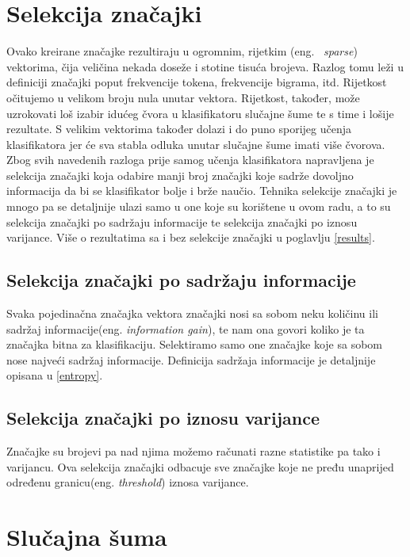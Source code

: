 \section{Selekcija značajki}
Ovako kreirane značajke rezultiraju u ogromnim, rijetkim (eng.~ \textit{sparse}) vektorima, čija veličina nekada doseže i stotine tisuća brojeva. Razlog tomu leži u definiciji značajki poput frekvencije tokena, frekvencije bigrama, itd. Rijetkost očitujemo u velikom broju nula unutar vektora. Rijetkost, također, može uzrokovati loš izabir idućeg čvora u klasifikatoru slučajne šume te s time i lošije rezultate. S velikim vektorima također dolazi i do puno sporijeg učenja klasifikatora jer će sva stabla odluka unutar slučajne šume imati više čvorova. Zbog svih navedenih razloga prije samog učenja klasifikatora napravljena je selekcija značajki koja odabire manji broj značajki koje sadrže dovoljno informacija da bi se klasifikator bolje i brže naučio. Tehnika selekcije značajki je mnogo pa se detaljnije ulazi samo u one koje su korištene u ovom radu, a to su selekcija značajki po sadržaju informacije te selekcija značajki po iznosu varijance. Više o rezultatima sa i bez selekcije značajki u poglavlju \ref{results}.

\subsection{Selekcija značajki po sadržaju informacije}

Svaka pojedinačna značajka vektora značajki nosi sa sobom neku količinu ili sadržaj informacije(eng. \textit{information gain}), te nam ona govori koliko je ta značajka bitna za klasifikaciju. Selektiramo samo one značajke koje sa sobom nose najveći sadržaj informacije. Definicija sadržaja informacije je detaljnije opisana u \ref{entropy}.

\subsection{Selekcija značajki po iznosu varijance}

Značajke su brojevi pa nad njima možemo računati razne statistike pa tako i varijancu. Ova selekcija značajki odbacuje sve značajke koje ne pređu unaprijed određenu granicu(eng. \textit{threshold}) iznosa varijance.

\section{Slučajna šuma} \label{sec:rf}

